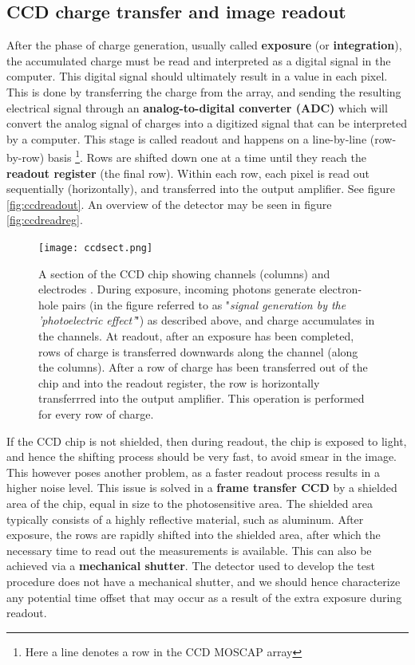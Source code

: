 \documentclass[../main.tex]{subfiles}
\begin{document}
	\subsection{CCD charge transfer and image readout}
	After the phase of charge generation, usually called \textbf{exposure} (or \textbf{integration}), the accumulated charge must be read and interpreted as a digital signal in the computer. This digital signal should ultimately result in a value in each pixel. This is done by transferring the charge from the array, and sending the resulting electrical signal through an \textbf{analog-to-digital converter (ADC)} which will convert the analog signal of charges into a digitized signal that can be interpreted by a computer. This stage is called readout and happens on a line-by-line (row-by-row) basis \footnote{Here a line denotes a row in the CCD MOSCAP array}. Rows are shifted down one at a time until they reach the \textbf{readout register} (the final row). Within each row, each pixel is read out sequentially (horizontally), and transferred into the output amplifier. See figure \ref{fig:ccdreadout}. An overview of the detector may be seen in figure \ref{fig:ccdreadreg}.
	
	\begin{figure}[h!]
		\centering
		\texttt{[image: ccdsect.png]}
		\caption{A section of the CCD chip showing channels (columns) and electrodes \cite{teledyneart}. During exposure, incoming photons generate electron-hole pairs (in the figure referred to as "\textit{signal generation by the 'photoelectric effect'}") as described above, and charge accumulates in the channels. At readout, after an exposure has been completed, rows of charge is transferred downwards along the channel (along the columns). After a row of charge has been transferred out of the chip and into the readout register, the row is horizontally transferrred into the output amplifier. This operation is performed for every row of charge.
		}
		\label{fig:ccdsect}
	\end{figure}
	
	If the CCD chip is not shielded, then during readout, the chip is exposed to light, and hence the shifting process should be very fast, to avoid smear in the image. This however poses another problem, as a faster readout process results in a higher noise level. This issue is solved in a \textbf{frame transfer CCD} by a shielded area of the chip, equal in size to the photosensitive area. The shielded area typically consists of a highly reflective material, such as aluminum. After exposure, the rows are rapidly shifted into the shielded area, after which the necessary time to read out the measurements is available. This can also be achieved via a \textbf{mechanical shutter}. The detector used to develop the test procedure does not have a mechanical shutter, and we should hence characterize any potential time offset that may occur as a result of the extra exposure during readout.
	
\end{document}
